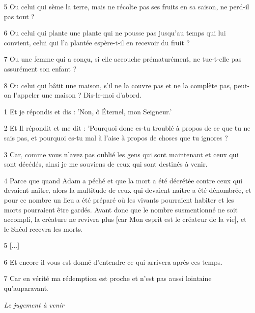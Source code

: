 \par 5 Ou celui qui sème la terre, mais ne récolte pas ses fruits en sa saison, ne perd-il pas tout ?

\par 6 Ou celui qui plante une plante qui ne pousse pas jusqu'au temps qui lui convient, celui qui l'a plantée espère-t-il en recevoir du fruit ?

\par 7 Ou une femme qui a conçu, si elle accouche prématurément, ne tue-t-elle pas assurément son enfant ?

\par 8 Ou celui qui bâtit une maison, s'il ne la couvre pas et ne la complète pas, peut-on l'appeler une maison ? Dis-le-moi d’abord.


\par 1 Et je répondis et dis : 'Non, ô Éternel, mon Seigneur.'

\par 2 Et Il répondit et me dit : 'Pourquoi donc es-tu troublé à propos de ce que tu ne sais pas, et pourquoi es-tu mal à l'aise à propos de choses que tu ignores ?

\par 3 Car, comme vous n'avez pas oublié les gens qui sont maintenant et ceux qui sont décédés, ainsi je me souviens de ceux qui sont destinés à venir.

\par 4 Parce que quand Adam a péché et que la mort a été décrétée contre ceux qui devaient naître, alors la multitude de ceux qui devaient naître a été dénombrée, et pour ce nombre un lieu a été préparé où les vivants pourraient habiter et les morts pourraient être gardés. Avant donc que le nombre susmentionné ne soit accompli, la créature ne revivra plus [car Mon esprit est le créateur de la vie], et le Shéol recevra les morts.

\par 5 [...]

\par 6 Et encore il vous est donné d'entendre ce qui arrivera après ces temps.

\par 7 Car en vérité ma rédemption est proche et n'est pas aussi lointaine qu'auparavant.


\par \textit{Le jugement à venir}

